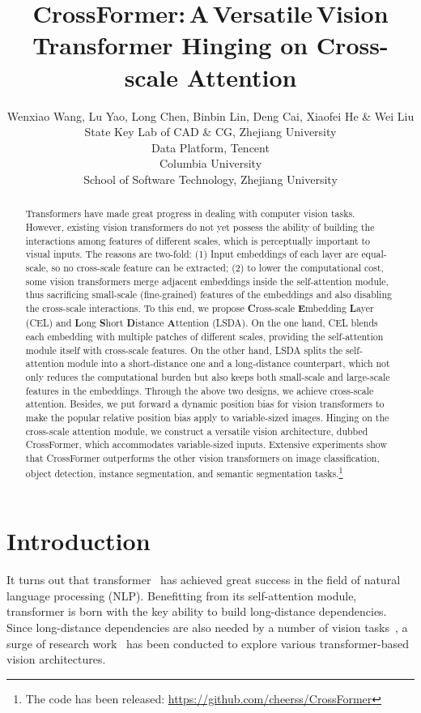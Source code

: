 \documentclass{article} \usepackage{iclr2022_conference,times}
\title{CrossFormer:\,A\,Versatile\,Vision Transformer Hinging on Cross-scale Attention}
\author{Wenxiao Wang, Lu Yao, Long Chen, Binbin Lin, Deng Cai, Xiaofei He \& Wei Liu \\
    State Key Lab of CAD \& CG, Zhejiang University \\
    Data Platform, Tencent \\
    Columbia University \\
    School of Software Technology, Zhejiang University\\
}
\begin{document}
\maketitle
\vspace{-4mm}
\begin{abstract}
    Transformers have made great progress in dealing with computer vision tasks. However, existing vision transformers do not yet possess the ability of building the interactions among features of different scales, which is perceptually important to visual inputs. The reasons are two-fold: (1) Input embeddings of each layer are equal-scale, so no cross-scale feature can be extracted; (2) to lower the computational cost, some vision transformers merge adjacent embeddings inside the self-attention module, thus sacrificing small-scale (fine-grained) features of the embeddings and also disabling the cross-scale interactions. To this end, we propose \textbf{C}ross-scale \textbf{E}mbedding \textbf{L}ayer (CEL) and \textbf{L}ong \textbf{S}hort \textbf{D}istance \textbf{A}ttention (LSDA). On the one hand, CEL blends each embedding with multiple patches of different scales, providing the self-attention module itself with cross-scale features. On the other hand, LSDA splits the self-attention module into a short-distance one and a long-distance counterpart, which not only reduces the computational burden but also keeps both small-scale and large-scale features in the embeddings. Through the above two designs, we achieve cross-scale attention. Besides, we put forward a dynamic position bias for vision transformers to make the popular relative position bias apply to variable-sized images. Hinging on the cross-scale attention module, we construct a versatile vision architecture, dubbed CrossFormer, which accommodates variable-sized inputs. Extensive experiments show that CrossFormer outperforms the other vision transformers on image classification, object detection, instance segmentation, and semantic segmentation tasks.\footnote{The code has been released: \href{https://github.com/cheerss/CrossFormer}{https://github.com/cheerss/CrossFormer}}
\end{abstract}

 \vspace{-3mm}
\section{Introduction}
\vspace{-2mm}
It turns out that transformer~\citep{DBLP:conf/nips/VaswaniSPUJGKP17,DBLP:conf/naacl/DevlinCLT19,DBLP:conf/nips/BrownMRSKDNSSAA20} has achieved great success in the field of natural language processing (NLP). Benefitting from its self-attention module, transformer is born with the key ability to build long-distance dependencies. Since long-distance dependencies are also needed by a number of vision tasks~\citep{DBLP:journals/corr/abs-2105-13677,DBLP:journals/corr/abs-2104-13840}, a surge  of research work~\citep{DBLP:conf/iclr/DosovitskiyB0WZ21,DBLP:conf/icml/TouvronCDMSJ21,DBLP:journals/corr/abs-2102-12122} has been conducted to explore various transformer-based vision architectures.
\end{document}
